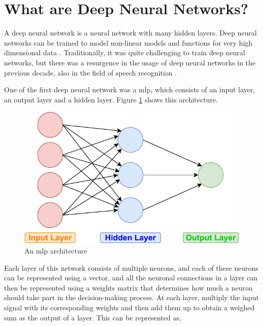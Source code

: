 \section{What are Deep Neural Networks?}
A deep neural network is a neural network with many hidden layers. Deep neural networks can be trained to model non-linear models and functions for very high dimensional data \cite{Hammer2003AMachines}. Traditionally, it was quite challenging to train deep neural networks, but there was a resurgence in the usage of deep neural networks in the previous decade, also in the field of speech recognition \cite{Dahl2012Context-DependentRecognition, Morgan2012DeepRecognition, Deng2013RECENTMICROSOFT, Hannun2014DeepRecognition}. 

One of the first deep neural network was a \acrfull{mlp}, which consists of an input layer, an output layer and a hidden layer. Figure \ref{fig:mlp} shows this architecture. 

\begin{figure}[ht]
  \begin{center}
    \includegraphics[width=\textwidth]{images/MLP.pdf} 
    \caption{An \acrshort{mlp} architecture}
    \label{fig:mlp}
  \end{center}
\end{figure}

Each layer of this network consists of multiple neurons, and each of these neurons can be represented using a vector, and all the neuronal connections in a layer can then be represented using a weights matrix that determines how much a neuron should take part in the decision-making process. At each layer, multiply the input signal with its corresponding weights and then add them up to obtain a weighed sum as the output of a layer. This can be represented as,

